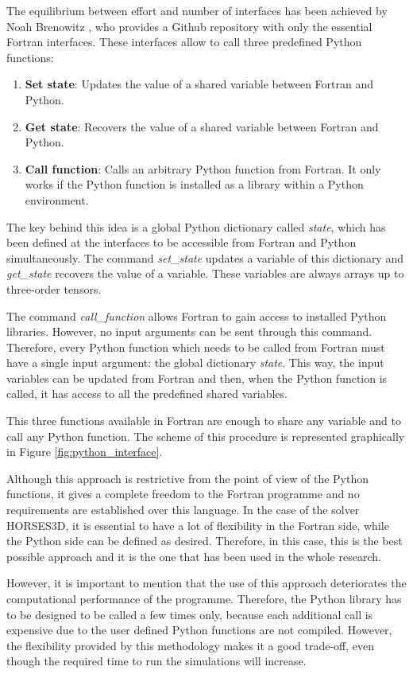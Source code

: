 The equilibrium between effort and number of interfaces has been achieved by Noah Brenowitz \cite{call_py_fort}, who provides a Github 
repository with only the essential Fortran interfaces. These interfaces allow to call three predefined Python functions:
\begin{enumerate}
    \item \textbf{Set state}: Updates the value of a shared variable between Fortran and Python.
    \item \textbf{Get state}: Recovers the value of a shared variable between Fortran and Python.
    \item \textbf{Call function}: Calls an arbitrary Python function from Fortran. It only works if the Python function is installed as a 
    library within a Python environment.
\end{enumerate}

The key behind this idea is a global Python dictionary called \emph{state}, which has been defined at the interfaces to be accessible from 
Fortran and Python simultaneously. The command \emph{set\_state} updates a variable of this dictionary and \emph{get\_state} recovers the 
value of a variable. These variables are always arrays up to three-order tensors.

The command \emph{call\_function} allows Fortran to gain access to installed Python libraries. However, no input arguments can be sent 
through this command. Therefore, every Python function which needs to be called from Fortran must have a single input argument: the global 
dictionary \emph{state}. This way, the input variables can be updated from Fortran and then, when the Python function is called, it has 
access to all the predefined shared variables.

This three functions available in Fortran are enough to share any variable and to call any Python function. The scheme of this procedure is 
represented graphically in Figure \ref{fig:python_interface}.

Although this approach is restrictive from the point of view of the Python functions, it gives a complete freedom to the Fortran programme 
and no requirements are established over this language.
In the case of the solver HORSES3D, it is essential to have a lot of flexibility in the Fortran side, while the Python side can be defined as 
desired. Therefore, in this case, this is the best possible approach and it is the one that has been used in the whole research.

However, it is important to mention that the use of this approach deteriorates the computational performance of the programme. Therefore, the 
Python library has to be designed to be called a few times only, because each additional call is expensive due to the user defined Python 
functions are not compiled. However, the flexibility provided by this methodology makes it a good trade-off, even though the required time to 
run the simulations will increase.

